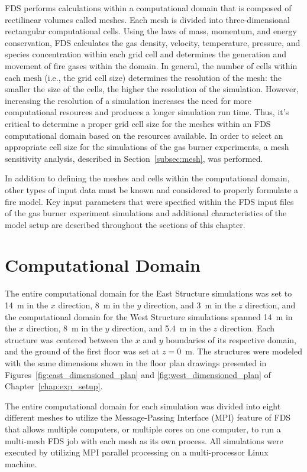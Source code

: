 FDS performs calculations within a computational domain that is composed of rectilinear volumes called meshes. Each mesh is divided into three-dimensional rectangular computational cells. Using the laws of mass, momentum, and energy conservation, FDS calculates the gas density, velocity, temperature, pressure, and species concentration within each grid cell and determines the generation and movement of fire gases within the domain. In general, the number of cells within each mesh (i.e., the grid cell size) determines the resolution of the mesh: the smaller the size of the cells, the higher the resolution of the simulation. However, increasing the resolution of a simulation increases the need for more computational resources and produces a longer simulation run time. Thus, it's critical to determine a proper grid cell size for the meshes within an FDS computational domain based on the resources available. In order to select an appropriate cell size for the simulations of the gas burner experiments, a mesh sensitivity analysis, described in Section~\ref{subsec:mesh}, was performed.  

In addition to defining the meshes and cells within the computational domain, other types of input data must be known and considered to properly formulate a fire model. Key input parameters that were specified within the FDS input files of the gas burner experiment simulations and additional characteristics of the model setup are described throughout the sections of this chapter.

\section{Computational Domain}
The entire computational domain for the East Structure simulations was set to 14~m in the $x$ direction, 8~m in the $y$ direction, and 3~m in the $z$ direction, and the computational domain for the West Structure simulations spanned 14~m in the $x$ direction, 8~m in the $y$ direction, and 5.4~m in the $z$ direction. Each structure was centered between the $x$ and $y$ boundaries of its respective domain, and the ground of the first floor was set at $z=0$~m. The structures were modeled with the same dimensions shown in the floor plan drawings presented in Figures~\ref{fig:east_dimensioned_plan} and \ref{fig:west_dimensioned_plan} of Chapter~\ref{chap:exp_setup}. 

The entire computational domain for each simulation was divided into eight different meshes to utilize the Message-Passing Interface (MPI) feature of FDS that allows multiple computers, or multiple cores on one computer, to run a multi-mesh FDS job with each mesh as its own process. All simulations were executed by utilizing MPI parallel processing on a multi-processor Linux machine.

